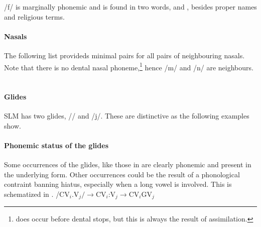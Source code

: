 
/f/ is marginally phonemic and is found in two words,  and , besides proper names and religious terms.


\paragraph{Nasals} The following list provideds minimal pairs for all pairs of neighbouring nasals. Note that there is no dental nasal phoneme,\footnote{ does occur before dental stops, but this is always the result of assimilation.} hence /m/ and /n/ are neighbours.\\

\\
 
\paragraph{Glides}
SLM has two glides, /\V/ and /j/. These are distinctive as the following examples show.


\paragraph{Phonemic status of the glides}\label{sec:phon:nonphonemicglideformation}
Some occurrences of the glides, like those in  are clearly phonemic and present in the underlying form. Other occurrences could be the result of a phonological contraint banning hiatus, especially when a long vowel is involved. This is schematized in  \citep[cf.][23]{Tapovanaye1995}.
\ea\label{ex:phon:glide:threemorae} /CV$_i$.V$_j/\to$CV$_i$:V$_j\to$CV$_i$GV$_j$\z

